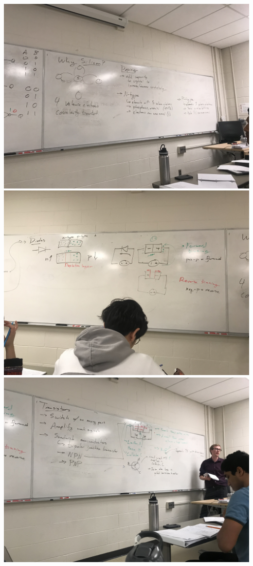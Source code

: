 \documentclass[11pt]{book}
\begin{document}
\\
\includegraphics[width=\textwidth]{figures/4_9_19_board4.jpg}
\\
\includegraphics[width=\textwidth]{figures/4_9_19_board5.jpg}
\\
\includegraphics[width=\textwidth]{figures/4_9_19_board6.jpg}
\end{document}
